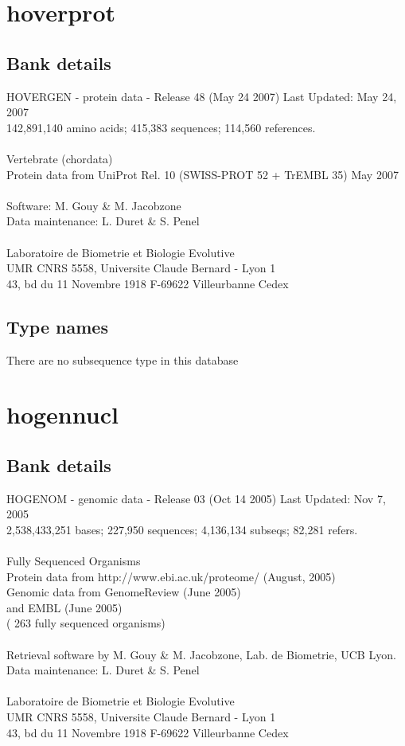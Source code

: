 \documentclass{article}
\begin{document}
\begin{Schunk}
\section{ hoverprot }
\subsection{Bank details}
HOVERGEN - protein data - Release 48 (May 24 2007) Last Updated: May 24, 2007\\
142,891,140 amino acids; 415,383 sequences; 114,560 references.\\
\\
Vertebrate (chordata)\\
Protein data from UniProt Rel. 10 (SWISS-PROT 52 + TrEMBL 35) May 2007\\
\\
Software: M. Gouy \& M. Jacobzone\\
Data maintenance: L. Duret \& S. Penel\\
\\
Laboratoire de Biometrie et Biologie Evolutive\\
UMR CNRS 5558, Universite Claude Bernard - Lyon 1\\
43, bd du 11 Novembre 1918 F-69622 Villeurbanne Cedex\\


\subsection{Type names}
There are no subsequence type in this database
\section{ hogennucl }
\subsection{Bank details}
HOGENOM - genomic data - Release 03 (Oct 14 2005) Last Updated: Nov  7, 2005\\
2,538,433,251 bases; 227,950 sequences; 4,136,134 subseqs; 82,281 refers.\\
\\
Fully Sequenced Organisms\\
Protein data from http://www.ebi.ac.uk/proteome/ (August, 2005)\\
Genomic data from GenomeReview  (June 2005)\\
and  EMBL (June 2005)\\
( 263 fully sequenced organisms)\\
\\
Retrieval software by M. Gouy \& M. Jacobzone, Lab. de Biometrie, UCB Lyon.\\
Data maintenance: L. Duret \& S. Penel\\
\\
Laboratoire de Biometrie et Biologie Evolutive\\
UMR CNRS 5558, Universite Claude Bernard - Lyon 1\\
43, bd du 11 Novembre 1918 F-69622 Villeurbanne Cedex\\



\end{Schunk}
\end{document}
